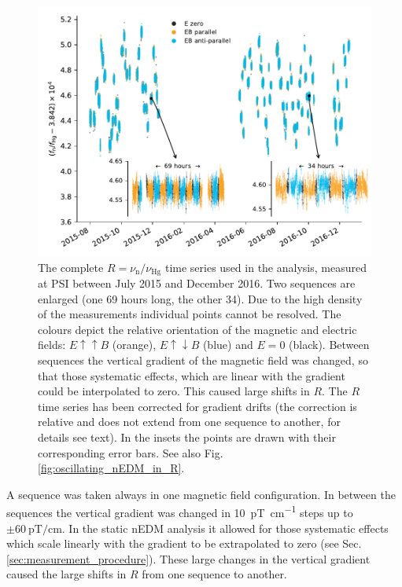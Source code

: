 \begin{figure}
  \centering
  \includegraphics[width=\linewidth]{gfx/axions/deltah4mm_time_domain_inset_no_yerr.pdf}
  \caption{The complete $R = \nu_\text{n} / \nu_\text{Hg}$ time series used in the analysis, measured at PSI between July 2015 and December 2016.
  Two sequences are enlarged (one 69 hours long, the other 34).
  Due to the high density of the measurements individual points cannot be resolved.
  The colours depict the relative orientation of the magnetic and electric fields: $E \uparrow \uparrow B$ (orange), $E \uparrow \downarrow B$ (blue) and $E=0$ (black).
  Between sequences the vertical gradient of the magnetic field was changed, so that those systematic effects, which are linear with the gradient could be interpolated to zero.
  This caused large shifts in $R$.
  The $R$ time series has been corrected for gradient drifts (the correction is relative and does not extend from one sequence to another, for details see text).
  In the insets the points are drawn with their corresponding error bars. See also Fig.\,\ref{fig:oscillating_nEDM_in_R}.}\label{fig:PSI_dataset_time_domain}
\end{figure}

A sequence was taken always in one magnetic field configuration.
In between the sequences the vertical gradient was changed in \SI[per-mode=symbol]{10}{\pico\tesla\per\centi\metre} steps up to $\pm \SI[per-mode=symbol]{60}{\pico\tesla\per\centi\metre}$.
In the static nEDM analysis it allowed for those systematic effects which scale linearly with the gradient to be extrapolated to zero (see Sec.\,\ref{sec:measurement_procedure}).
These large changes in the vertical gradient caused the large shifts in $R$ from one sequence to another.




